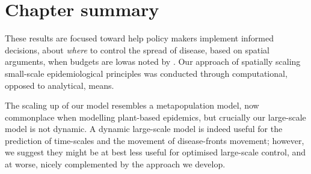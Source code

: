 
\section{Chapter summary}



These results are focused toward help policy makers implement informed decisions, about \textit{where} to control the spread of disease, based on spatial arguments, when budgets are low\textemdash as noted by \cite{time-varying-infectivity}. Our approach of spatially scaling small-scale epidemiological principles was conducted through computational, opposed to analytical, means. 

The scaling up of our model resembles a metapopulation model, now commonplace when modelling plant-based epidemics, but crucially our large-scale model is not dynamic. A dynamic large-scale model is indeed useful for the prediction of time-scales and the movement of disease-fronts movement; however, we suggest they might be at best less useful for optimised large-scale control, and at worse, nicely complemented by the approach we develop.

